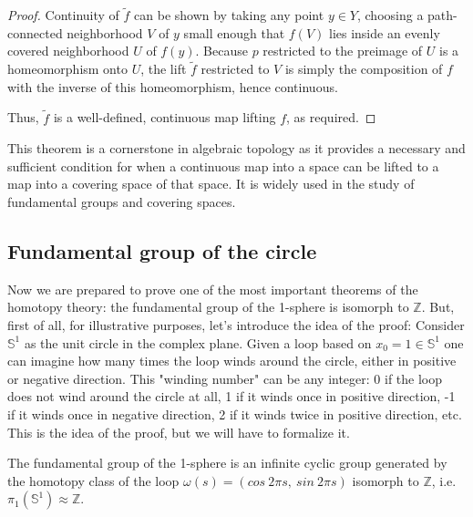 \documentclass[12pt]{article}
\begin{document}
\begin{proof}
	Continuity of \(\tilde{f}\) can be shown by taking any point \(y \in Y\), choosing a path-connected neighborhood \(V\) of \(y\) small enough that \(f(V)\) lies inside an evenly covered neighborhood \(U\) of \(f(y)\). Because \(p\) restricted to the preimage of \(U\) is a homeomorphism onto \(U\), the lift \(\tilde{f}\) restricted to \(V\) is simply the composition of \(f\) with the inverse of this homeomorphism, hence continuous.
	
	Thus, \(\tilde{f}\) is a well-defined, continuous map lifting \(f\), as required.
\end{proof}

This theorem is a cornerstone in algebraic topology as it provides a necessary and sufficient condition for when a continuous map into a space can be lifted to a map into a covering space of that space. It is widely used in the study of fundamental groups and covering spaces.


\subsection{Fundamental group of the circle}

Now we are prepared to prove one of the most important theorems of the homotopy theory: the fundamental group of the 1-sphere is isomorph to \(\mathbb{Z}\). But, first of all, for illustrative purposes, let's introduce the idea of the proof: Consider \(\mathbb{S}^1\) as the unit circle in the complex plane. Given a loop based on \(x_0 = 1 \in \mathbb{S}^1\) one can imagine how many times the loop winds around the circle, either in positive or negative direction. This "winding number" can be any integer: 0 if the loop does not wind around the circle at all, 1 if it winds once in positive direction, -1 if it winds once in negative direction, 2 if it winds twice in positive direction, etc. This is the idea of the proof, but we will have to formalize it.

\begin{theorem}
	The fundamental group of the 1-sphere is an infinite cyclic group generated by the homotopy class of the loop \(\omega(s) = (cos \ 2\pi s, \ sin \ 2\pi s)\) isomorph to \(\mathbb{Z}\), i.e. \(\pi_1(\mathbb{S}^1) \approx \mathbb{Z}\).
\end{theorem}
\end{document}
